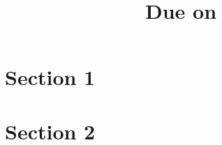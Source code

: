 \documentclass[12pt]{article}
\title{
    \vspace{2in}
    \textmd{\textbf{\hmwkClass}\\ \hmwkTitle}\\
    \normalsize\vspace{0.1in}\small{Due on \hmwkDueDate}\\
    \vspace{3in}
}
\author{\textbf{\hmwkAuthorName}}
\date{}
\begin{document}
    \maketitle
    \thispagestyle{firststyle}
    \newpage
    \section{Section 1}
    \newpage
    \section{Section 2}
\end{document}
